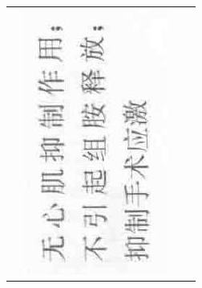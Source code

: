 \documentclass[10pt]{article}
\begin{document}
\begin{center}
\begin{tabular}{|c|c|c|c|}
 & \includegraphics[max width=\textwidth]{2024_07_05_645bb794a4d4f32ee0c8g-332(1)}

\end{tabular}
\end{center}
\end{document}
